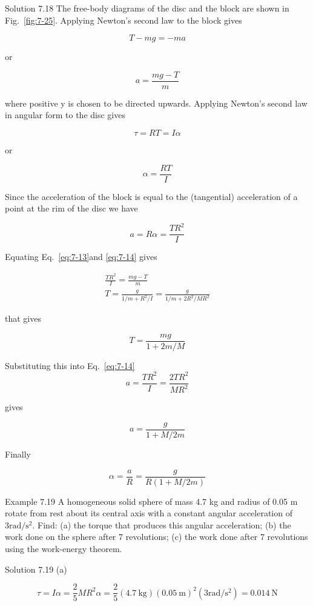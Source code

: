 \documentclass[10pt]{article}
\numberwithin{equation}{section}
\begin{document}
Solution 7.18 The free-body diagrams of the disc and the block are shown in Fig.~\ref{fig:7-25}. Applying Newton's second law to the block gives

$$
T-m g=-m a
$$

or


\begin{equation}
a=\frac{m g-T}{m} \label{eq:7-13}
\end{equation}


where positive y is chosen to be directed upwards. Applying Newton's second law in angular form to the disc gives

$$
\tau=R T=I \alpha
$$

or

$$
\alpha=\frac{R T}{I}
$$

Since the acceleration of the block is equal to the (tangential) acceleration of a point at the rim of the disc we have


\begin{equation}
a=R \alpha=\frac{T R^{2}}{I} \label{eq:7-14}
\end{equation}


Equating Eq.~\eqref{eq:7-13}and \eqref{eq:7-14} gives

$$
\begin{gathered}
\frac{T R^{2}}{I}=\frac{m g-T}{m} \\
T=\frac{g}{1 / m+R^{2} / I}=\frac{g}{1 / m+2 R^{2} / M R^{2}}
\end{gathered}
$$

that gives

$$
T=\frac{m g}{1+2 m / M}
$$

Substituting this into Eq.~\eqref{eq:7-14}$$
a=\frac{T R^{2}}{I}=\frac{2 T R^{2}}{M R^{2}}
$$

gives

$$
a=\frac{g}{1+M / 2 m}
$$

Finally

$$
\alpha=\frac{a}{R}=\frac{g}{R(1+M / 2 m)}
$$

Example 7.19 A homogeneous solid sphere of mass 4.7 kg and radius of 0.05 m rotate from rest about its central axis with a constant angular acceleration of $3 \mathrm{rad} / \mathrm{s}^{2}$. Find: (a) the torque that produces this angular acceleration; (b) the work done on the sphere after 7 revolutions; (c) the work done after 7 revolutions using the work-energy theorem.

Solution 7.19 (a)

$$
\tau=I \alpha=\frac{2}{5} M R^{2} \alpha=\frac{2}{5}(4.7 \mathrm{~kg})(0.05 \mathrm{~m})^{2}\left(3 \mathrm{rad} / \mathrm{s}^{2}\right)=0.014 \mathrm{~N}
$$
\end{document}
